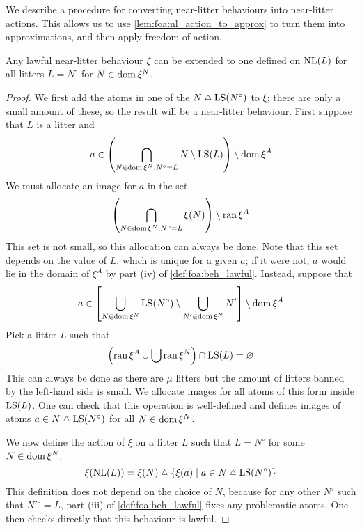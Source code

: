 We describe a procedure for converting near-litter behaviours into near-litter actions.
This allows us to use \cref{lem:foa:nl_action_to_approx} to turn them into approximations, and then apply freedom of action.

\begin{lemma}
    \label{lem:foa:beh_to_action}
    Any lawful near-litter behaviour \( \xi \) can be extended to one defined on \( \operatorname{NL}(L) \) for all litters \( L = N^\circ \) for \( N \in \operatorname{dom} \xi^N \).
\end{lemma}
\begin{proof}
    We first add the atoms in one of the \( N \symmdiff \LS(N^\circ) \) to \( \xi \); there are only a small amount of these, so the result will be a near-litter behaviour.
    First suppose that \( L \) is a litter and
    \[ a \in \left(\bigcap_{N \in \operatorname{dom} \xi^N, N^\circ = L} N \setminus \operatorname{LS}(L)\right) \setminus \operatorname{dom} \xi^A \]
    We must allocate an image for \( a \) in the set
    \[ \left(\bigcap_{N \in \operatorname{dom} \xi^N, N^\circ = L} \xi(N)\right) \setminus \operatorname{ran} \xi^A \]
    This set is not small, so this allocation can always be done.
    Note that this set depends on the value of \( L \), which is unique for a given \( a \); if it were not, \( a \) would lie in the domain of \( \xi^A \) by part (iv) of \cref{def:foa:beh_lawful}.
    Instead, suppose that
    \[ a \in \left[\bigcup_{N \in \operatorname{dom} \xi^N} \operatorname{LS}(N^\circ) \setminus \bigcup_{N' \in \operatorname{dom} \xi^N} N' \right] \setminus \operatorname{dom} \xi^A \]
    Pick a litter \( L \) such that
    \[ \left(\operatorname{ran} \xi^A \cup \bigcup \operatorname{ran} \xi^N\right) \cap \operatorname{LS}(L) = \varnothing \]
    This can always be done as there are \( \mu \) litters but the amount of litters banned by the left-hand side is small.
    We allocate images for all atoms of this form inside \( \operatorname{LS}(L) \).
    One can check that this operation is well-defined and defines images of atoms \( a \in N \symmdiff \LS(N^\circ) \) for all \( N \in \operatorname{dom} \xi^N \).

    We now define the action of \( \xi \) on a litter \( L \) such that \( L = N^\circ \) for some \( N \in \operatorname{dom} \xi^N \).
    \[ \xi(\NL(L)) = \xi(N) \symmdiff \{ \xi(a) \mid a \in N \symmdiff \LS(N^\circ) \} \]
    This definition does not depend on the choice of \( N \), because for any other \( N' \) such that \( {N'}^\circ = L \), part (iii) of \cref{def:foa:beh_lawful} fixes any problematic atoms.
    One then checks directly that this behaviour is lawful.
\end{proof}

